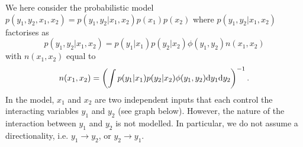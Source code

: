 We here consider the probabilistic model $p(y_1,y_2,x_1,x_2) = p(y_1,
y_2 | x_1, x_2)p(x_1) p(x_2)$ where $p(y_1, y_2 | x_1, x_2)$
factorises as
\begin{equation}
  p(y_1, y_2 | x_1, x_2) = p(y_1 | x_1) p(y_2 | x_2) \phi(y_1,y_2) n(x_1,x_2)
\end{equation}
with  $n(x_1,x_2)$ equal to
\begin{equation}
  n(x_1,x_2) = \left(\int p(y_1 | x_1) p(y_2 | x_2) \phi(y_1,y_2) \mathrm{d} y_1 \mathrm{d} y_2\right)^{-1}.
  \label{eq:ndef}
\end{equation}
In the model, $x_1$ and $x_2$ are two independent inputs that each control
the interacting variables $y_1$ and $y_2$ (see graph below). However, the
nature of the interaction between $y_1$ and $y_2$ is not modelled. In
particular, we do not assume a directionality, i.e. $y_1 \rightarrow y_2$, or $y_2 \rightarrow y_1$.

\begin{center}
\end{center}


